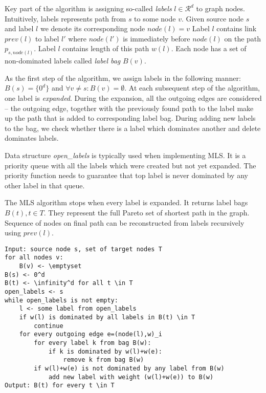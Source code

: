 Key part of the algorithm is assigning so-called \emph{labels} $l\in \mathcal{R}^d$ to graph nodes.
Intuitively, labels represents path from $s$ to some node $v$.
Given source node $s$ and label $l$ we denote its corresponding node $node(l)=v$
Label $l$ contains link $prev(l)$ to label $l'$ where $node(l')$ is immediately before $node(l)$ on the path $p_{s,node(l)}$.
Label $l$ contains length of this path $w(l)$.
Each node has a set of non-dominated labels called \emph{label bag} $B(v)$.

As the first step of the algorithm, we assign labels in the following manner: $B(s)=\{0^d\}$ and $\forall v \ne s: B(v)=\emptyset$.
At each subsequent step of the algorithm, one label is \emph{expanded}. 
During the expansion, all the outgoing edges are considered -- the outgoing edge, together with the previously found path to the label make up the path that is added to corresponding label bag. 
During adding new labels to the bag, we check whether there is a label which dominates another and delete dominates labels.

Data structure {\em open\_labels} is typically used when implementing MLS. It is a priority queue with all the labels which were created but not yet expanded. The priority function needs to guarantee that top label is never dominated by any other label in that queue.

The MLS algorithm stops when every label is expanded. It returns label bags $B(t), t \in T$. 
They represent the full Pareto set of shortest path in the graph.
Sequence of nodes on final path can be reconstructed from labels recursively using $prev(l)$.

\renewcommand{\lstlistingname}{Pseudocode} 
\begin{lstlisting}[caption={MLS Algorithm},label=MLSalg,captionpos=t,float,abovecaptionskip=-\medskipamount]
Input: source node s, set of target nodes T
for all nodes v:
	B(v) <- \emptyset
B(s) <- 0^d
B(t) <- \infinity^d for all t \in T
open_labels <- s
while open_labels is not empty:
	l <- some label from open_labels
    if w(l) is dominated by all labels in B(t) \in T
    	continue
    for every outgoing edge e=(node(l),w)_i
    	for every label k from bag B(w):
            if k is dominated by w(l)+w(e):
            	remove k from bag B(w)
        if w(l)+w(e) is not dominated by any label from B(w)
            add new label with weight (w(l)+w(e)) to B(w)
Output: B(t) for every t \in T
\end{lstlisting}

